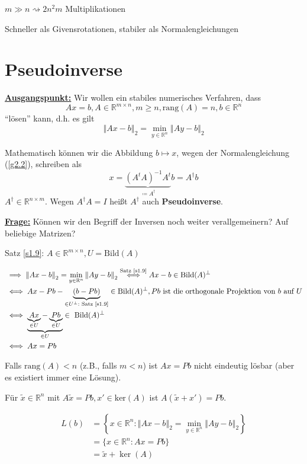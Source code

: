 \documentclass{book}
\def\R{\mathbb{R}}
\def\rang{\text{rang}}
\begin{document}
        $m\gg n \rightsquigarrow 2n^2m$ Multiplikationen

        Schneller als Givensrotationen, stabiler als Normalengleichungen

    \section{Pseudoinverse}

        \underline{\textbf{Ausgangspunkt:}} Wir wollen ein stabiles numerisches Verfahren, dass 
        \[
            Ax=b,A\in\R^{m\times n},m\geq n,\rang(A)=n,b\in\R^n    
        \]
        ``lösen'' kann, d.h. es gilt 
        \[
            \left\Vert Ax-b \right\Vert_2=\min_{y\in\R^n}\left\Vert Ay-b \right\Vert_2    
        \]

        Mathematisch können wir die Abbildung $b\mapsto x$, wegen der Normalengleichung (\ref{g2.2}), schreiben als 
        \[
            x=\underbrace{(A^tA)^{-1}A^t}_{\coloneqq A^\dagger}b=A^\dagger b    
        \]
        $A^\dagger\in\R^{n\times m}$. Wegen $A^\dagger A=I$ heißt $A^\dagger$ auch \textbf{Pseudoinverse}.

        \underline{\textbf{Frage:}} Können wir den Begriff der Inversen noch weiter verallgemeinern? Auf beliebige Matrizen?

        Satz \ref{s1.9}: $A\in\R^{m\times n}, U=\text{Bild}(A)$

        \begin{align*}
            &\implies \left\Vert Ax-b \right\Vert_2=\min_{y\in\R^n} \left\Vert Ay-b \right\Vert_2 \stackrel{\text{Satz \ref{s1.9}}}{\iff} Ax-b\in\text{Bild}(A)^\perp\\
            &\iff Ax- Pb -\underbrace{(b-Pb)}_{\in U^\perp:\text{ Satz \ref{s1.9}}}\in\text{Bild}(A)^\perp, Pb \text{ ist die orthogonale Projektion von } b \text{ auf } U\\
            &\iff \underbrace{\underbrace{Ax}_{\in U}-\underbrace{Pb}_{\in U}}_{\in U}\in\text{ Bild}(A)^\perp\\
            & \iff Ax=Pb
        \end{align*}

        Falls $\rang(A)<n$ (z.B., falls $m<n$) ist $Ax=Pb$ nicht eindeutig lösbar (aber es existiert immer eine Lösung).

        Für $\tilde{x}\in\R^n$ mit $A\tilde{x}=Pb,x'\in\text{ker}(A)$ ist $A(\tilde{x}+x')=Pb$.

        \begin{align*}
            L(b)&=\left\{x\in\R^n:\left\Vert Ax-b \right\Vert_2 = \min_{y\in\R^n} \left\Vert Ay-b \right\Vert_2\right\}\\
            &=\{x\in\R^n:Ax=Pb\}\\
            &=\tilde{x}+\ker(A)
        \end{align*}
\end{document}
